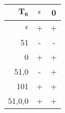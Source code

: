 \begingroup
\scriptsize
\begin{tabular}{r | c c}
    $\mathbf{T_6}$ & $\epsilon$ & 0\\ \hline
    $\epsilon$ & + & + \\
    51 & - & - \\ \hline
    0 & + & + \\
    51,0 & - & + \\
    101 & + & + \\
    51,0,0 & + & +
\end{tabular}
\endgroup
